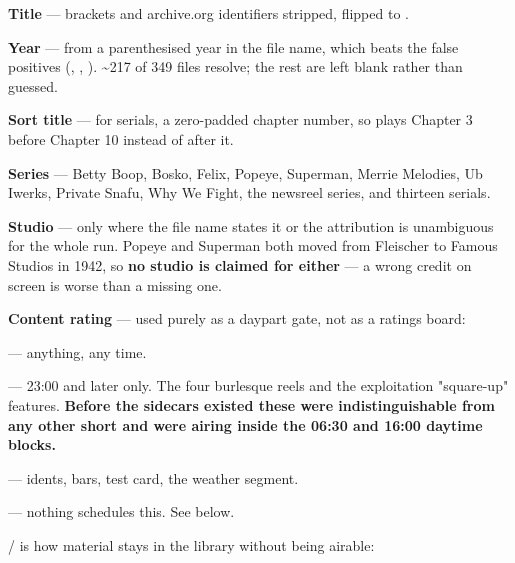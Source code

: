 \documentclass[fontpath=fonts/,logopath=logo/]{riposte-doc}
\begin{document}
\begin{ripbullets}
\item \textbf{Title} — brackets and archive.org identifiers stripped,  flipped to .
\item \textbf{Year} — from a parenthesised year in the file name, which beats the false positives (, , ). \textasciitilde{}217 of 349 files resolve; the rest are left blank rather than guessed.
\item \textbf{Sort title} — for serials, a zero-padded chapter number, so  plays Chapter 3 before Chapter 10 instead of after it.
\item \textbf{Series} — Betty Boop, Bosko, Felix, Popeye, Superman, Merrie Melodies, Ub Iwerks, Private Snafu, Why We Fight, the newsreel series, and thirteen serials.
\item \textbf{Studio} — only where the file name states it or the attribution is unambiguous for the whole run. Popeye and Superman both moved from Fleischer to Famous Studios in 1942, so \textbf{no studio is claimed for either} — a wrong credit on screen is worse than a missing one.
\item \textbf{Content rating} — used purely as a daypart gate, not as a ratings board:
\begin{ripbullets}
\item {} — anything, any time.
\item {} — 23:00 and later only. The four burlesque reels and the exploitation "square-up" features. \textbf{Before the sidecars existed these were indistinguishable from any other short and were airing inside the 06:30 and 16:00 daytime blocks.}
\item {} — idents, bars, test card, the weather segment.
\item {} — nothing schedules this. See below.
\end{ripbullets}

\end{ripbullets}



 /  is how material stays in the library without being airable:
\end{document}
